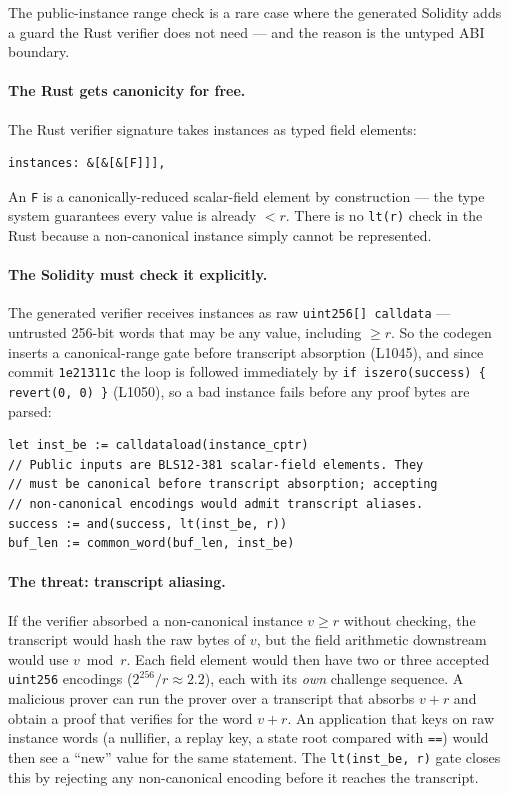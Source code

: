 The public-instance range check is a rare case where the generated
Solidity adds a guard the Rust verifier does not need --- and the
reason is the untyped ABI boundary.

\paragraph{The Rust gets canonicity for free.} The Rust verifier
signature takes instances as typed field elements:
\begin{lstlisting}[style=rust]
instances: &[&[&[F]]],
\end{lstlisting}
An \texttt{F} is a canonically-reduced scalar-field element by
construction --- the type system guarantees every value is already
$< r$. There is no \texttt{lt(r)} check in the Rust because a
non-canonical instance simply cannot be represented.

\paragraph{The Solidity must check it explicitly.} The generated
verifier receives instances as raw \texttt{uint256[] calldata} ---
untrusted 256-bit words that may be any value, including $\ge r$.
So the codegen inserts a canonical-range gate before transcript
absorption (L1045), and since commit \texttt{1e21311c} the loop is
followed immediately by \texttt{if iszero(success) \{ revert(0, 0) \}}
(L1050), so a bad instance fails before any proof bytes are parsed:
\begin{lstlisting}[style=yul]
let inst_be := calldataload(instance_cptr)
// Public inputs are BLS12-381 scalar-field elements. They
// must be canonical before transcript absorption; accepting
// non-canonical encodings would admit transcript aliases.
success := and(success, lt(inst_be, r))
buf_len := common_word(buf_len, inst_be)
\end{lstlisting}

\paragraph{The threat: transcript aliasing.} If the verifier
absorbed a non-canonical instance $v \ge r$ without checking, the
transcript would hash the raw bytes of $v$, but the field arithmetic
downstream would use $v \bmod r$. Each field element would then have
two or three accepted \texttt{uint256} encodings
($2^{256}/r \approx 2.2$), each with its \emph{own} challenge
sequence. A malicious prover can run the prover over a transcript that
absorbs $v + r$ and obtain a proof that verifies for the word $v+r$.
An application that keys on raw instance words (a nullifier, a
replay key, a state root compared with \texttt{==}) would then see a
``new'' value for the same statement. The
\texttt{lt(inst\_be, r)} gate closes this by rejecting any
non-canonical encoding before it reaches the transcript.

